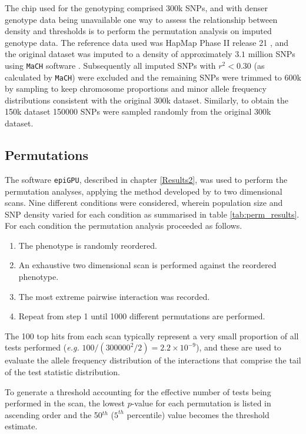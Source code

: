 The chip used for the genotyping comprised 300k SNPs, and with denser genotype data being unavailable one way to assess the relationship between density and thresholds is to perform the permutation analysis on imputed genotype data. The reference data used was HapMap Phase II release 21 \citep{Frazer2007}, and the original dataset was imputed to a density of approximately $3.1$ million SNPs using {\tt MaCH} software \citep{Li2009,Li2010}. Subsequently all imputed SNPs with $r^2 < 0.30$ (as calculated by {\tt MaCH}) were excluded and the remaining SNPs were trimmed to 600k by sampling to keep chromosome proportions and minor allele frequency distributions consistent with the original 300k dataset. Similarly, to obtain the 150k dataset 150000 SNPs were sampled randomly from the original 300k dataset.


\subsection{Permutations}

The software {\tt epiGPU}, described in chapter \ref{Results2}, was used to perform the permutation analyses, applying the method developed by \citet{Churchill1994a} to two dimensional scans. Nine different conditions were considered, wherein population size and SNP density varied for each condition as summarised in table \ref{tab:perm_results}. For each condition the permutation analysis proceeded as follows.

\begin{enumerate}
\item The phenotype is randomly reordered.
\item An exhaustive two dimensional scan is performed against the reordered phenotype.
\item The most extreme pairwise interaction was recorded.
\item Repeat from step 1 until 1000 different permutations are performed.
\end{enumerate}

The 100 top hits from each scan typically represent a very small proportion of all tests performed (\emph{e.g.} $100 / (300000^2 / 2) = 2.2 \times 10^{-9}$), and these are used to evaluate the allele frequency distribution of the interactions that comprise the tail of the test statistic distribution. 

To generate a threshold accounting for the effective number of tests being performed in the scan, the lowest $p$-value for each permutation is listed in ascending order and the 50$^{th}$ ($5^{th}$ percentile) value becomes the threshold estimate.

